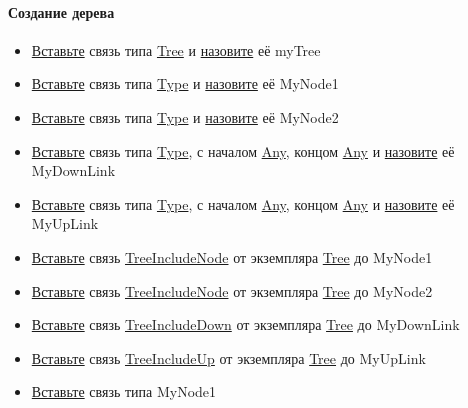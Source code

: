 \documentclass{article}
\begin{document}
\paragraph{Создание дерева}
\begin{itemize}
  \item \hyperlink{DeepCase.InsertLink.Description}{Вставьте} связь типа
        \hyperlink{Tree}{Tree} и \hyperlink{FAQ.HowToSetName}{назовите} её myTree
  \item \hyperlink{DeepCase.InsertLink.Description}{Вставьте} связь типа
        \hyperlink{Type.Description}{Type} и \hyperlink{FAQ.HowToSetName}{назовите} её MyNode1
  \item \hyperlink{DeepCase.InsertLink.Description}{Вставьте} связь типа
        \hyperlink{Type.Description}{Type} и \hyperlink{FAQ.HowToSetName}{назовите} её MyNode2
  \item \hyperlink{DeepCase.InsertLink.Description}{Вставьте} связь типа
        \hyperlink{Type.Description}{Type}, с началом \hyperlink{Core.Any.Description}{Any}, концом
        \hyperlink{Core.Any.Description}{Any} и \hyperlink{FAQ.HowToSetName}{назовите} её
        MyDownLink
  \item \hyperlink{DeepCase.InsertLink.Description}{Вставьте} связь типа
        \hyperlink{Type.Description}{Type}, с началом \hyperlink{Core.Any.Description}{Any}, концом
        \hyperlink{Core.Any.Description}{Any} и \hyperlink{FAQ.HowToSetName}{назовите} её
        MyUpLink
  \item \hyperlink{DeepCase.InsertLink.Description}{Вставьте} связь
        \hyperlink{Core.TreeIncludeNode.Description}{TreeIncludeNode} от
        экземпляра \hyperlink{Core.Tree.Description}{Tree} до MyNode1
  \item \hyperlink{DeepCase.InsertLink.Description}{Вставьте} связь
        \hyperlink{Core.TreeIncludeNode.Description}{TreeIncludeNode} от
        экземпляра \hyperlink{Core.Tree.Description}{Tree} до MyNode2
  \item \hyperlink{DeepCase.InsertLink.Description}{Вставьте} связь
        \hyperlink{Core.TreeIncludeDown.Description}{TreeIncludeDown} от
        экземпляра \hyperlink{Core.Tree.Description}{Tree} до MyDownLink
  \item \hyperlink{DeepCase.InsertLink.Description}{Вставьте} связь
        \hyperlink{Core.TreeIncludeNode.Description}{TreeIncludeUp} от
        экземпляра \hyperlink{Core.Tree.Description}{Tree} до MyUpLink
  \item \hyperlink{DeepCase.InsertLink.Description}{Вставьте} связь типа MyNode1

\end{itemize}
\end{document}
